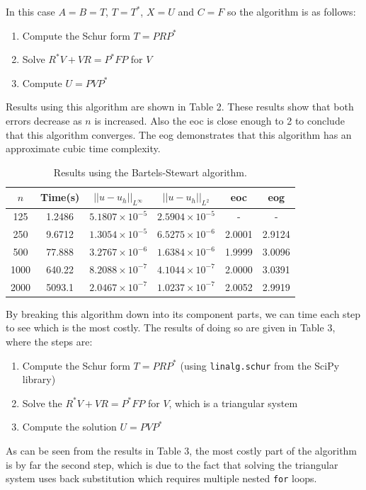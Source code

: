 \documentclass{article}
\numberwithin{equation}{section}
\begin{document}
In this case $A=B=T$, $T=T^*$, $X=U$ and $C=F$ so the algorithm is as follows:
\begin{enumerate}
\item Compute the Schur form $T=PRP^*$
\item Solve $R^*V + VR = P^*FP$ for $V$
\item Compute $U=PVP^*$
\end{enumerate}

Results using this algorithm are shown in Table 2. These results show that both errors decrease as $n$ is increased. Also the eoc is close enough to 2 to conclude that this algorithm converges. The eog demonstrates that this algorithm has an approximate cubic time complexity. 

\begin{table}[H]
\centering
\begin{tabular}{|c|c|c|c|c|c|}
\hline
$n$ & Time(s) & $|| u - u_h ||_{L^{\infty}}$ &$|| u - u_h ||_{L^{2}}$ & eoc & eog \\
\hline
125 & 1.2486 & $5.1807 \times 10^{-5}$ & $2.5904 \times 10^{-5}$ & - & - \\
250 & 9.6712 & $1.3054 \times 10^{-5}$ & $6.5275 \times 10^{-6}$ & 2.0001 & 2.9124 \\
500 & 77.888 & $3.2767 \times 10^{-6}$ & $1.6384 \times 10^{-6}$ & 1.9999 & 3.0096 \\ 
1000 & 640.22 & $8.2088 \times 10^{-7}$ & $4.1044 \times 10^{-7}$ & 2.0000 & 3.0391 \\
2000 & 5093.1 & $2.0467 \times 10^{-7}$ & $1.0237 \times 10^{-7}$ & 2.0052 & 2.9919 \\
\hline
\end{tabular}
\caption{Results using the Bartels-Stewart algorithm.}
\end{table}

By breaking this algorithm down into its component parts, we can time each step to see which is the most costly. The results of doing so are given in Table 3, where the steps are:

\begin{enumerate}
\item Compute the Schur form $T=PRP^*$ (using \texttt{linalg.schur} from the SciPy library)
\item Solve the $R^*V + VR = P^*FP$ for $V$, which is a triangular system
\item Compute the solution $U=PVP^*$
\end{enumerate}

As can be seen from the results in Table 3, the most costly part of the algorithm is by far the second step, which is due to the fact that solving the triangular system uses back substitution which requires multiple nested \texttt{for} loops.
\end{document}
